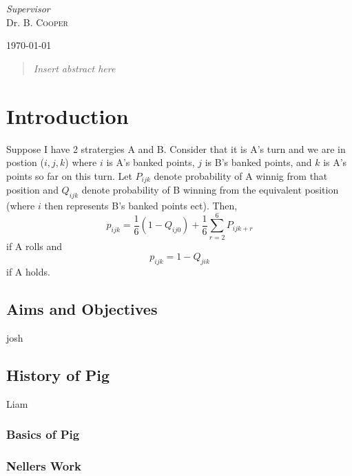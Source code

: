\documentclass[a4paper,titlepage]{article}
\begin{document}
\begin{titlepage}
	\vfill\vfill
	\textit{Supervisor}\\
	Dr. B. \textsc{Cooper}


	\vfill\vfill\vfill

	{\large\today}
	\vfill


	\newpage
	\begin{abstract}
	\textit{Insert abstract here}
	\end{abstract}
\end{titlepage}


\tableofcontents
\newpage

\section{Introduction}
Suppose I have 2 stratergies A and B. Consider that it is A's turn and we are in postion ($i,j,k$) where $i$ is A's banked points, $j$ is B's banked points, and $k$ is A's points so far on this turn. Let $P_{ijk}$ denote probability of A winnig from that position and $Q_{ijk}$ denote probability of B winning from the equivalent position (where $i$ then represents B's banked points ect). Then, \begin{equation}\label{1.1.a}
p_{ijk} = \dfrac{1}{6} (1-Q_{ij0}) + \dfrac{1}{6}\sum^{6}_{r=2}P_{ijk+r}
\end{equation}
 if A rolls and
 \begin{equation}\label{1.1.b}
 p_{ijk} = 1-Q_{jik}
 \end{equation}
 if A holds.
\subsection{Aims and Objectives}
josh
\subsection{History of Pig}
Liam
\subsubsection{Basics of Pig}
\subsubsection{Nellers Work}
\end{document}
